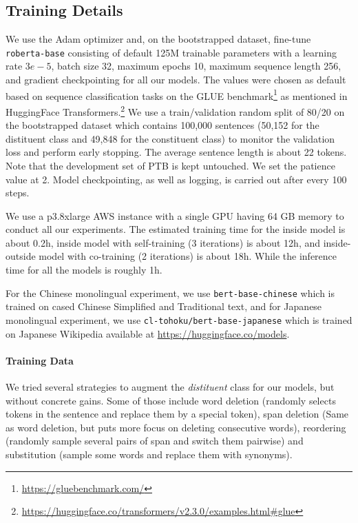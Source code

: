 \documentclass[11pt]{article}
\newcommand{\ptb}{\textsc{PTB}}
\begin{document}
\subsection{Training Details}
\label{appx:training-details}
We use the Adam optimizer and, on the bootstrapped dataset, fine-tune \texttt{roberta-base} consisting of default 125M trainable parameters with a learning rate $3e-5$, batch size 32, maximum epochs 10, maximum sequence length 256, and gradient checkpointing for all our models. The values were chosen as default based on sequence classification tasks on the GLUE benchmark\footnote{\url{https://gluebenchmark.com/}} as mentioned in HuggingFace Transformers.\footnote{\url{https://huggingface.co/transformers/v2.3.0/examples.html\#glue}} We use a train/validation random split of 80/20 on the bootstrapped dataset which contains 100,000 sentences (50,152 for the distituent class and 49,848 for the constituent class) to monitor the validation loss and perform early stopping. The average sentence length is about 22 tokens. Note that the development set of \ptb{} is kept untouched. We set the patience value at 2. Model checkpointing, as well as logging, is carried out after every 100 steps.

We use a p3.8xlarge AWS instance with a single GPU having 64 GB memory to conduct all our experiments. The estimated training time
for the inside model is about 0.2h, inside model with self-training (3 iterations) is about 12h, and inside-outside model with co-training (2 iterations) is about 18h. While the inference time for all the models is roughly 1h.

For the Chinese monolingual experiment, we use \texttt{bert-base-chinese} which is trained on cased Chinese Simplified and Traditional text, and for Japanese monolingual experiment, we use \texttt{cl-tohoku/bert-base-japanese} which is trained on Japanese Wikipedia available at \url{https://huggingface.co/models}.

\paragraph{Training Data}
We tried several strategies to augment the \emph{distituent} class for our models, but without concrete gains. Some of those include word deletion (randomly selects tokens in the sentence and
replace them by a special token), span deletion (Same as word deletion, but puts more focus on deleting consecutive words), reordering (randomly sample several pairs of span and switch them pairwise) and substitution (sample some words and replace them with synonyms).
\end{document}
